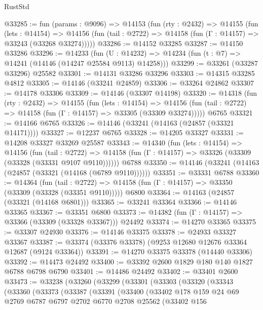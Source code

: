 \begin{lexlean}{RustStd}
\begin{coremodule}
@33285 := fun (params : @9096) =>
  @14153
    (fun (rty : @2432) =>
    @14155
      (fun (lets : @14154) =>
      @14156 (fun (tail : @2722) => @14158 (fun (Γ : @14157) => @33243 (@33268 @33274)))))
@33286 := @14152 @33285
@33287 := @14150 @33286
@33296 := @14233
    (fun (U : @14232) => @14234 (fun (t : @7) => @14241 (@14146 (@14247 @25584 @9113) @14258)))
@33299 := @33261 (@33287 @33296) @25582
@33301 := @14131 @33286 @33296
@33303 := @14315 @33285 @4812
@33305 := @14146 (@33241 @24859)
@33306 := @33264 @24862
@33307 := @14178 @33306
@33309 := @14146 (@33307 @14198)
@33320 := @14318
    (fun (rty : @2432) =>
    @14155
      (fun (lets : @14154) =>
      @14156 (fun (tail : @2722) => @14158 (fun (Γ : @14157) => @33305 (@33309 @33274)))))
    @6765
@33321 := @14166 @6765
@33326 := @14146 (@33241 (@14163 (@24857 (@33321 @14171))))
@33327 := @12237 @6765
@33328 := @14205 @33327
@33331 := @14208 @33327 @33269 @25587
@33343 := @14340
    (fun (lets : @14154) =>
    @14156
      (fun (tail : @2722) =>
      @14158 (fun (Γ : @14157) => @33326 (@33309 (@33328 (@33331 @9107 @9110))))))
    @6788
@33350 := @14146 (@33241 (@14163 (@24857 (@33321 (@14168 (@6789 @9110))))))
@33351 := @33331 @6788
@33360 := @14364
    (fun (tail : @2722) => @14158 (fun (Γ : @14157) => @33350 (@33309 (@33328 (@33351 @9110)))))
    @6800
@33364 := @14163 (@24857 (@33321 (@14168 @6801)))
@33365 := @33241 @33364
@33366 := @14146 @33365
@33367 := @33351 @6800
@33373 := @14382 (fun (Γ : @14157) => @33366 (@33309 (@33328 @33367))) @24492
@33374 := @14270 @33365
@33375 := @33307 @24930
@33376 := @14146 @33375
@33378 := @24933 @33327 @33367
@33387 := @33374 (@33376 @33378) (@9253 @12680 @12676 @33364 @12687 (@9124 @33364))
@33391 := @14270 @33375 @33378 (@14440 @33306)
@33392 := @14473 @24492
@33400 := @33392 @2600 @1829 @180 @140 @1827 @6788 @6798 @6790
@33401 := @14486 @24492
@33402 := @33401 @2600
@33473 := @33238
    (@33260
      (@33299
        (@33301
          (@33303
            (@33320
              (@33343
                (@33360
                  (@33373
                    (@33387
                      (@33391
                        (@33400
                          (@33402
                            @178
                            @159
                            @24
                            @69
                            @2769
                            @6787
                            @6797
                            @2702
                            @6770
                            @2708
                            @25562
                            (@33402
                              @156

\end{coremodule}
\end{lexlean}
